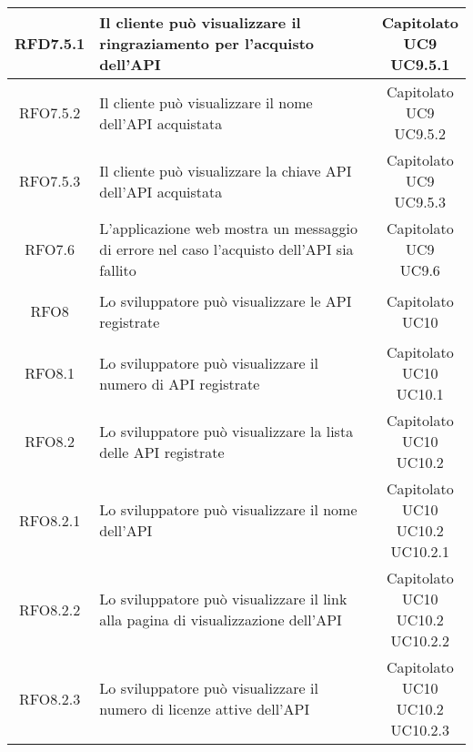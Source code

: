 \begin{longtable}{|c|p{8cm}|c|}
\hypertarget{RFD7.5.1}{RFD7.5.1} & Il cliente può visualizzare il ringraziamento per l'acquisto dell'API & \makecell*{Capitolato\\UC9\\UC9.5.1} \\
\hline
\hypertarget{RFO7.5.2}{RFO7.5.2} & Il cliente può visualizzare il nome dell'API acquistata & \makecell*{Capitolato\\UC9\\UC9.5.2} \\
\hline
\hypertarget{RFO7.5.3}{RFO7.5.3} & Il cliente può visualizzare la chiave API dell'API acquistata & \makecell*{Capitolato\\UC9\\UC9.5.3} \\
\hline

\hypertarget{RFO7.6}{RFO7.6} & L'applicazione web mostra un messaggio di errore nel caso l'acquisto dell'API sia fallito & \makecell*{Capitolato\\UC9\\UC9.6} \\
\hline

\hypertarget{RFO8}{RFO8} & Lo sviluppatore può visualizzare le API registrate & \makecell*{Capitolato\\UC10} \\
\hline

\hypertarget{RFO8.1}{RFO8.1} & Lo sviluppatore può visualizzare il numero di API registrate & \makecell*{Capitolato\\UC10\\UC10.1} \\
\hline

\hypertarget{RFO8.2}{RFO8.2} & Lo sviluppatore può visualizzare la lista delle API registrate & \makecell*{Capitolato\\UC10\\UC10.2} \\
\hline
\hypertarget{RFO8.2.1}{RFO8.2.1} & Lo sviluppatore può visualizzare il nome dell'API & \makecell*{Capitolato\\UC10\\UC10.2\\UC10.2.1} \\
\hline
\hypertarget{RFO8.2.2}{RFO8.2.2} & Lo sviluppatore può visualizzare il link alla pagina di visualizzazione dell'API & \makecell*{Capitolato\\UC10\\UC10.2\\UC10.2.2} \\
\hline
\hypertarget{RFO8.2.3}{RFO8.2.3} & Lo sviluppatore può visualizzare il numero di licenze attive dell'API & \makecell*{Capitolato\\UC10\\UC10.2\\UC10.2.3} \\
\hline


\end{longtable}
